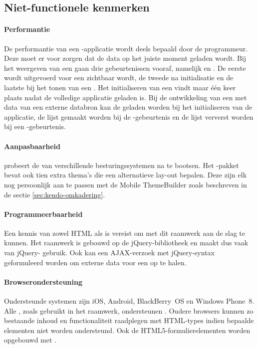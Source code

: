 \subsection{Niet-functionele kenmerken}
\label{sec:kendo-niet-functioneel}

\paragraph{Performantie}
De performantie van een \kendo{}-applicatie wordt deels bepaald door de programmeur.
Deze moet er voor zorgen dat de data op het juiste moment geladen wordt.
Bij het weergeven van een  gaan drie gebeurtenissen vooraf,  namelijk  en .
De eerste wordt uitgevoerd voor een  zichtbaar wordt,  de tweede na initialisatie en de laatste bij het tonen van een .
Het initialiseren van een  vindt maar één keer plaats nadat de volledige applicatie geladen is.
Bij de ontwikkeling van een  met data van een externe databron kan  de  geladen worden bij het initialiseren van de applicatie,  de lijst gemaakt worden bij de -gebeurtenis en de lijst ververst worden bij een -gebeurtenis.

\paragraph{Aanpasbaarheid}
\kendo{} probeert de  van verschillende besturingssystemen na te bootsen.
Het \kendo{}-pakket bevat ook tien extra thema's die een alternatieve lay-out bepalen.
Deze zijn elk nog persoonlijk aan te passen met de Mobile ThemeBuilder zoals beschreven in de sectie \ref{sec:kendo-omkadering}.

\paragraph{Programmeerbaarheid}
Een kennis van zowel HTML als \js{} is vereist om met dit raamwerk aan de slag te kunnen.
Het raamwerk is gebouwd op de jQuery-bibliotheek en maakt dus vaak van jQuery- gebruik.
Ook kan een AJAX-verzoek met jQuery-syntax geformuleerd worden om externe data voor een  op te halen.

\paragraph{Browserondersteuning}
Ondersteunde systemen zijn iOS, Android, BlackBerry~OS en Windows Phone~8.
Alle , zoals gebruikt in het raamwerk, ondersteunen .
Oudere browsers kunnen zo bestaande inhoud en functionaliteit raadplegen met  HTML-types indien bepaalde elementen niet worden ondersteund.
Ook de HTML5-formulierelementen worden opgebouwd met .

